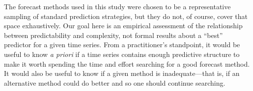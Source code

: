 The forecast methods used in this study were chosen to be a
representative sampling of standard prediction strategies, but they do
not, of course, cover that space exhaustively.  Our goal here is an
empirical assessment of the relationship between predictability and
complexity, not formal results about a ``best'' predictor for a given
time series.  From a practitioner's standpoint, it would be useful to
know \emph{ a priori} if a time series contains enough predictive
structure to make it worth spending the time and effort searching for
a good forecast method.  It would also be useful to know if a given
method is inadequate---that is, if an alternative method could do
better and so one should continue searching.


